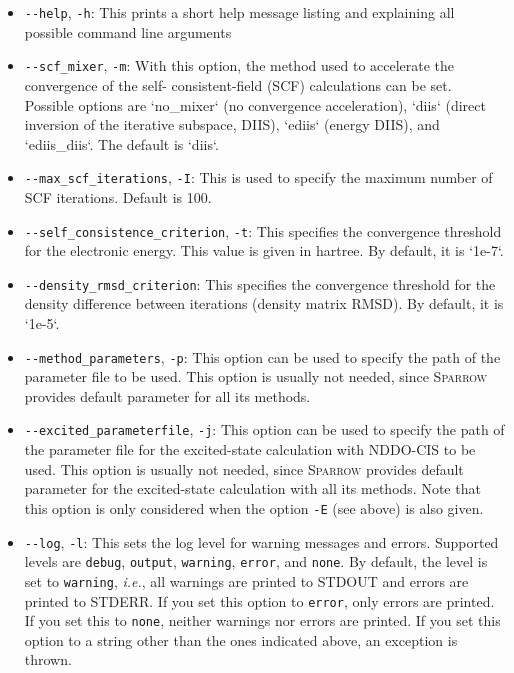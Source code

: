 \documentclass[]{tufte-book}
\begin{document}
\begin{itemize}
\item \texttt{-{}-help}, \texttt{-h}: This prints a short help message listing and explaining all possible command line 
arguments
\item \texttt{-{}-scf\_mixer}, \texttt{-m}: With this option, the method used to accelerate the convergence of the self-
consistent-field (SCF) calculations can be set. Possible options are `no\_mixer` (no convergence acceleration), `diis`
(direct inversion of the iterative subspace, DIIS), `ediis` (energy DIIS), and `ediis\_diis`. The
default is `diis`.
\item \texttt{-{}-max\_scf\_iterations}, \texttt{-I}: This is used to specify the maximum number of SCF iterations. Default is 100.
\item \texttt{-{}-self\_consistence\_criterion}, \texttt{-t}: This specifies the convergence threshold for the electronic energy.
This value is given in hartree. By default, it is `1e-7`. 
\item \texttt{-{}-density\_rmsd\_criterion}: This specifies the
  convergence threshold for the density difference between iterations (density
    matrix RMSD). By default, it is `1e-5`. 
\item \texttt{-{}-method\_parameters}, \texttt{-p}: This option can be used to specify the path of the parameter file to be
used. This option is usually not needed, since \textsc{Sparrow} provides default parameter for all its methods.
\item \texttt{-{}-excited\_parameterfile}, \texttt{-j}: This option can be used
  to specify the path of the parameter file for the excited-state calculation
    with NDDO-CIS to be used. This option is usually not needed, since \textsc{Sparrow} provides default parameter for 
    the excited-state calculation with all its methods. Note that this option is only considered when the
option \texttt{-E} (see above) is also given.
\item \texttt{-{}-log}, \texttt{-l}: This sets the log level for warning messages and errors. Supported levels are 
\texttt{debug}, \texttt{output}, \texttt{warning}, \texttt{error}, and
    \texttt{none}. By default, the level is set to
\texttt{warning}, \textit{i.e.}, all warnings are printed to STDOUT and errors are printed to STDERR. If you set this option to \texttt{error}, 
only errors are printed. If you set this to \texttt{none}, neither warnings nor
    errors are printed. If you set this option to a string other than the ones
    indicated above, an exception is thrown.

\end{itemize}
\end{document}
